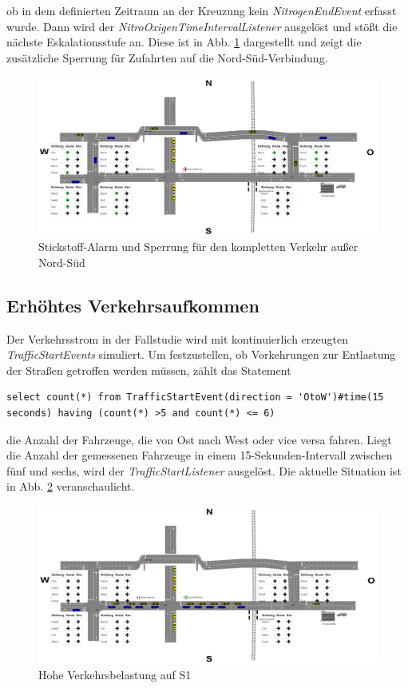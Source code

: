 ob in dem definierten Zeitraum an der Kreuzung kein \textit{NitrogenEndEvent} erfasst wurde. Dann wird der \textit{NitroOxigenTimeIntervalListener} ausgelöst und stößt die nächste Eskalationsstufe an. Diese ist in Abb. \ref{fig9} dargestellt und zeigt die zusätzliche Sperrung für Zufahrten auf die Nord-Süd-Verbindung.

\begin{figure}[ht]
	\includegraphics[width=\textwidth]{images/NitroOxigenStillHigh.png}
	\caption{Stickstoff-Alarm und Sperrung für den kompletten Verkehr außer Nord-Süd}
	\label{fig9}
\end{figure}


\subsection{Erhöhtes Verkehrsaufkommen}

Der Verkehrsstrom in der Fallstudie wird mit kontinuierlich erzeugten \textit{TrafficStartEvents} simuliert. Um festzustellen, ob  Vorkehrungen zur Entlastung der Straßen getroffen werden müssen, zählt das Statement

\begin{lstlisting}
select count(*) from TrafficStartEvent(direction = 'OtoW')#time(15 seconds) having (count(*) >5 and count(*) <= 6)
\end{lstlisting}

die Anzahl der Fahrzeuge, die von Ost nach West oder vice versa fahren. Liegt die Anzahl der gemessenen Fahrzeuge in einem 15-Sekunden-Intervall zwischen fünf und sechs, wird der \textit{TrafficStartListener} ausgelöst. Die aktuelle Situation ist in Abb. \ref{fig10} veranschaulicht.

\begin{figure}[ht]
	\includegraphics[width=\textwidth]{images/TrafficHigh.png}
	\caption{Hohe Verkehrsbelastung auf S1}
	\label{fig10}
\end{figure}


